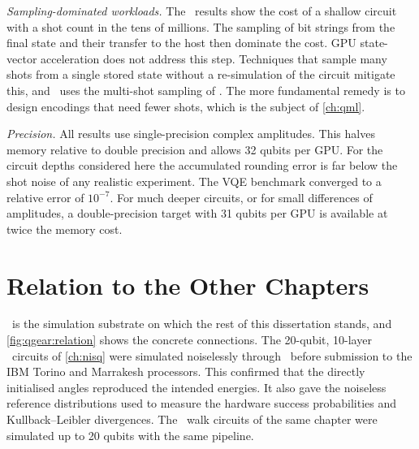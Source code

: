 \emph{Sampling-dominated workloads.} The \qcrank\ results show the cost of a shallow circuit with a shot count in the tens of millions. The sampling of bit strings from the final state and their transfer to the host then dominate the cost. GPU state-vector acceleration does not address this step. Techniques that sample many shots from a single stored state without a re-simulation of the circuit \cite{doi2023multishotgpu} mitigate this, and \qgear\ uses the multi-shot sampling of \cudaq. The more fundamental remedy is to design encodings that need fewer shots, which is the subject of \cref{ch:qml}.

\emph{Precision.} All results use single-precision complex amplitudes. This halves memory relative to double precision and allows 32 qubits per GPU. For the circuit depths considered here the accumulated rounding error is far below the shot noise of any realistic experiment. The VQE benchmark converged to a relative error of $10^{-7}$. For much deeper circuits, or for small differences of amplitudes, a double-precision target with 31 qubits per GPU is available at twice the memory cost.

\section{Relation to the Other Chapters}\label{sec:qgear:relation}

\qgear\ is the simulation substrate on which the rest of this dissertation stands, and \cref{fig:qgear:relation} shows the concrete connections. The 20-qubit, 10-layer \deal\ circuits of \cref{ch:nisq} were simulated noiselessly through \qgear\ before submission to the IBM Torino and Marrakesh processors. This confirmed that the directly initialised angles reproduced the intended energies. It also gave the noiseless reference distributions used to measure the hardware success probabilities and Kullback--Leibler divergences. The \qawa\ walk circuits of the same chapter were simulated up to 20 qubits with the same pipeline.

